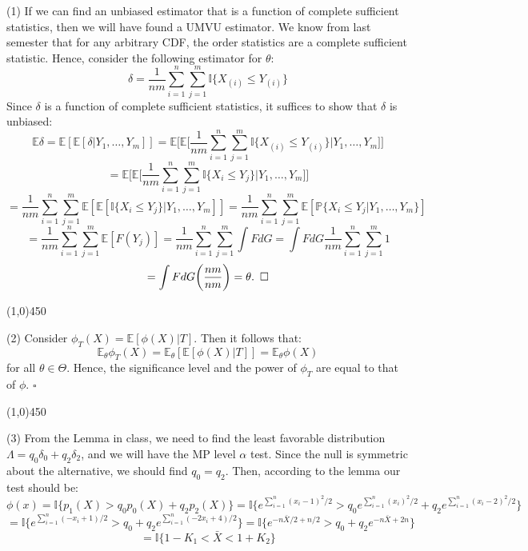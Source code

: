\documentclass[12pt]{article}
\begin{document}

\def\ci{\perp\!\!\!\perp}
\def\ex{\mathbb{E}}
\def\prob{\mathbb{P}}
\def\ind{\mathbb{I}}
\def\grad{\triangledown}
\def\bigo{\mathcal{O}}

\noindent
(1) If we can find an unbiased estimator that is a function of complete sufficient statistics, then we will have found a UMVU estimator. We know from last semester that for any arbitrary CDF, the order statistics are a complete sufficient statistic. Hence, consider the following estimator for $\theta$:
$$\delta = \frac{1}{nm}\sum_{i=1}^n \sum_{j=1}^m \ind\{X_{(i)} \leq Y_{(i)}\}$$
Since $\delta$ is a function of complete sufficient statistics, it suffices to show that $\delta$ is unbiased:
$$\ex \delta = \ex[ \ex[\delta|Y_1,\dots,Y_m]]
= \ex \biggl[ \ex \biggl[ \frac{1}{nm}\sum_{i=1}^n \sum_{j=1}^m \ind\{X_{(i)} \leq Y_{(i)}\} \biggr| Y_1,\dots,Y_m \biggr] \biggr]$$
$$= \ex\biggl[ \ex\biggl[ \frac{1}{nm}\sum_{i=1}^n \sum_{j=1}^m \ind\{X_i \leq Y_j \} \biggr|Y_1,\dots,Y_m\biggr]\biggr]$$
$$= \frac{1}{nm}\sum_{i=1}^n \sum_{j=1}^m \ex[ \ex[ \ind\{X_i \leq Y_j \} |Y_1,\dots,Y_m]]
= \frac{1}{nm}\sum_{i=1}^n \sum_{j=1}^m \ex[ \prob\{X_i \leq Y_j |Y_1,\dots,Y_m \} ]$$
$$= \frac{1}{nm}\sum_{i=1}^n \sum_{j=1}^m \ex[ F(Y_j) ]
= \frac{1}{nm}\sum_{i=1}^n \sum_{j=1}^m \int F dG
=  \int F dG \frac{1}{nm}\sum_{i=1}^n \sum_{j=1}^m 1$$
$$= \int F dG \biggl( \frac{nm}{nm} \biggr)
= \theta. \hspace{5 pt} \square$$

 \begin{center}
\line(1,0){450}
\end{center}

\noindent
(2) Consider $\phi_T(X) = \ex[\phi(X)|T]$. Then it follows that:
$$ \ex_\theta \phi_T(X) = \ex_\theta [ \ex[\phi(X)|T]] = \ex_\theta \phi(X)$$
for all $\theta\in\Theta$. Hence, the significance level and the power of $\phi_T$ are equal to that of $\phi$. $\square$

 \begin{center}
\line(1,0){450}
\end{center}

\pagebreak
\noindent
(3) From the Lemma in class, we need to find the least favorable distribution $\Lambda = q_0\delta_0+q_2\delta_2$, and we will have the MP level $\alpha$ test. Since the null is symmetric about the alternative, we should find $q_0 = q_2$. Then, according to the lemma our test should be:
$$\phi(x) = \ind{\{ p_1(X) > q_0 p_0(X)+ q_2 p_2(X) \}}
= \ind{\{ e^{\sum_{i=1}^n(x_i-1)^2/2} > q_0 e^{\sum_{i=1}^n(x_i)^2/2}+ q_2 e^{\sum_{i=1}^n(x_i-2)^2/2} \}}$$
$$ = \ind{\{ e^{\sum_{i=1}^n(-x_i+1)/2} > q_0 + q_2 e^{\sum_{i=1}^n(-2x_i+4)/2} \}}
= \ind{\{ e^{-n\bar{X}/2+n/2} > q_0 + q_2 e^{-n\bar{X}+2n} \}}$$
$$= \ind\{ 1-K_1 < \bar{X} < 1+K_2\}$$
\end{document}
